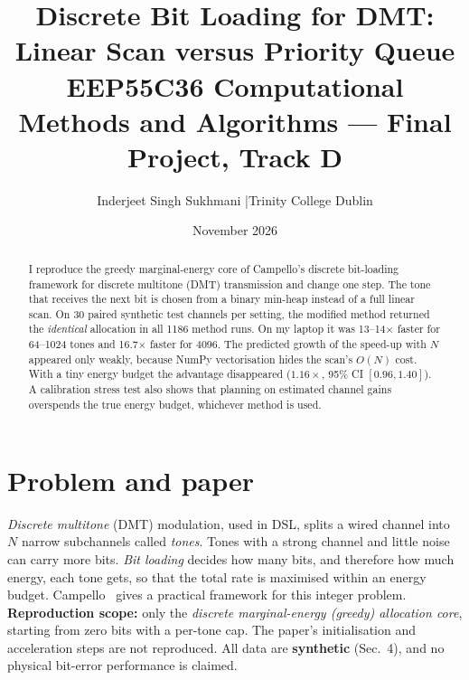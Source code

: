 \documentclass[10pt,a4paper]{article}
\title{\vspace{-1.3cm}\textbf{Discrete Bit Loading for DMT: Linear Scan versus Priority Queue}\\[2pt]
\large EEP55C36 Computational Methods and Algorithms --- Final Project, Track D}
\author{Inderjeet Singh Sukhmani \quad|\quad Trinity College Dublin}
\date{November 2026}
\begin{document}
\maketitle
\vspace{-0.9cm}
\begin{abstract}\noindent\small
I reproduce the greedy marginal-energy core of Campello's discrete bit-loading framework for discrete multitone (DMT)
transmission and change one step. The tone that receives the next bit is chosen from a binary min-heap instead of a full
linear scan. On 30 paired synthetic test channels per setting, the modified method returned the \emph{identical}
allocation in all 1186 method runs. On my laptop it was 13--14$\times$ faster for 64--1024 tones and 16.7$\times$
faster for 4096. The predicted growth of the speed-up with $N$ appeared only weakly, because NumPy vectorisation hides
the scan's $O(N)$ cost. With a tiny energy budget the advantage disappeared ($1.16\times$, 95\% CI $[0.96, 1.40]$).
A calibration stress test also shows that planning on estimated channel gains overspends the true energy budget,
whichever method is used.
\end{abstract}

\section{Problem and paper}
\emph{Discrete multitone} (DMT) modulation, used in DSL, splits a wired channel into $N$ narrow subchannels called
\emph{tones}. Tones with a strong channel and little noise can carry more bits. \emph{Bit loading} decides how many bits,
and therefore how much energy, each tone gets, so that the total rate is maximised within an energy budget.
Campello~\cite{campello} gives a practical framework for this integer problem. \textbf{Reproduction scope:} only the
\emph{discrete marginal-energy (greedy) allocation core}, starting from zero bits with a per-tone cap. The paper's
initialisation and acceleration steps are not reproduced. All data are \textbf{synthetic} (Sec.~4), and no physical
bit-error performance is claimed.
\end{document}
